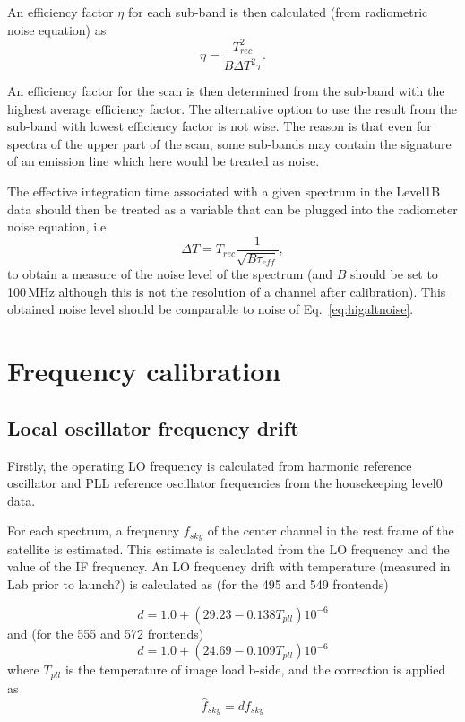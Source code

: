 An efficiency factor \(\eta\) for each sub-band is then calculated (from radiometric noise equation) as
\begin{equation}
\eta = \frac{T_{rec}^2}{B\Delta T^{2}\tau}.
\end{equation}

An efficiency factor for the scan is then determined from the sub-band
with the highest average efficiency factor. The alternative option
to use the result from the sub-band with lowest efficiency factor
is not wise. The reason is that even for spectra of the upper part
of the scan, some sub-bands may contain the signature of an emission 
line which here would be treated as noise.

The effective integration time associated with a given spectrum
in the Level1B data should then be treated as a 
variable that can be plugged into the radiometer noise equation,
i.e
\begin{equation}
\Delta T = T_{rec}\frac{1}{\sqrt{B\tau_{eff}}},
\end{equation}
to obtain a measure of the noise level of the spectrum
(and \(B\) should be set to 100\,MHz although this is not
the resolution of a channel after calibration).
This obtained noise level should be comparable to noise 
of Eq.~\ref{eq:higaltnoise}.


\section{Frequency calibration}

\subsection{Local oscillator frequency drift}

Firstly, the operating LO frequency is calculated
from harmonic reference oscillator and PLL reference oscillator 
frequencies from the housekeeping level0 data.

For each spectrum, a frequency \(f_{sky}\) of the center channel in 
the rest frame of the satellite is estimated.
This estimate is calculated from the LO frequency and the 
value of the IF frequency.
An LO frequency drift with temperature (measured in Lab prior to launch?) 
is calculated as (for the 495 and 549 frontends)

\begin{equation}
  d = 1.0+(29.23-0.138T_{pll})10^{-6}
\end{equation}
and (for the 555 and 572 frontends)
\begin{equation}
  d = 1.0+(24.69-0.109T_{pll})10^{-6}
\end{equation}
where \(T_{pll}\) is the temperature of image load b-side,
and the correction is applied as
\begin{equation}
 \hat{f}_{sky}= d f_{sky}
\end{equation}

